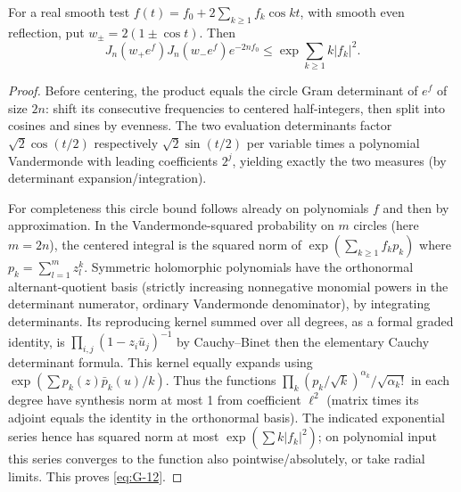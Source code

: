 \begin{lemma}\label{lem:03-circle}\label{E:circle-comparison}
For a real smooth test \(f(t)=f_0+2\sum_{k\ge1} f_k\cos kt\), with smooth even reflection, put \(w_\pm=2(1\pm\cos t)\). Then
\begin{equation}
 J_n(w_+ e^f)J_n(w_- e^f)e^{-2n f_0}\le \exp\sum_{k\ge1} k |f_k|^2 .
 \label{eq:G-12}
\end{equation}
\end{lemma}
\begin{proof}
Before centering, the product equals the circle Gram determinant of \(e^f\) of size \(2n\): shift its consecutive frequencies to centered half-integers, then split into cosines and sines by evenness. The two evaluation determinants factor \(\sqrt2\cos(t/2)\) respectively \(\sqrt2\sin(t/2)\) per variable times a polynomial Vandermonde with leading coefficients \(2^j\), yielding exactly the two measures (by determinant expansion/integration).

For completeness this circle bound follows already on polynomials \(f\) and then by approximation. In the Vandermonde-squared probability on \(m\) circles (here \(m=2n\)), the centered integral is the squared norm of \(\exp(\sum_{k\ge1} f_k p_k)\) where \(p_k=\sum_{l=1}^m z_l^k\). Symmetric holomorphic polynomials have the orthonormal alternant-quotient basis (strictly increasing nonnegative monomial powers in the determinant numerator, ordinary Vandermonde denominator), by integrating determinants. Its reproducing kernel summed over all degrees, as a formal graded identity, is \(\prod_{i,j}(1-z_i\bar u_j)^{-1}\) by Cauchy–Binet then the elementary Cauchy determinant formula. This kernel equally expands using \(\exp(\sum p_k(z)\bar p_k(u)/k)\). Thus the functions \(\prod_k (p_k/\sqrt k)^{\alpha_k}/\sqrt{\alpha_k!}\) in each degree have synthesis norm at most 1 from coefficient \(\ell^2\) (matrix times its adjoint equals the identity in the orthonormal basis). The indicated exponential series hence has squared norm at most \(\exp(\sum k|f_k|^2)\); on polynomial input this series converges to the function also pointwise/absolutely, or take radial limits. This proves \eqref{eq:G-12}.

\end{proof}

